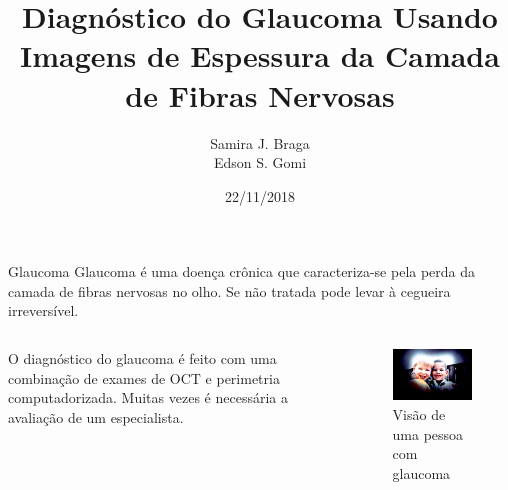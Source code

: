 \documentclass{beamer}
\title{Diagnóstico do Glaucoma Usando Imagens de Espessura da Camada de Fibras Nervosas}
\author{Samira J. Braga \\ Edson S. Gomi}
\institute{Escola Politécnica da Universidade de São Paulo}
\date{22/11/2018}
\begin{document}

\begin{frame}
	\maketitle %
\end{frame}




\begin{frame}{Glaucoma}
    Glaucoma é uma doença crônica que caracteriza-se pela perda da camada de fibras nervosas no olho. Se não tratada pode  levar  à  cegueira  irreversível.
    \vfill
    \begin{columns}
        O  diagnóstico  do  glaucoma  é  feito  com  uma combinação  de  exames de OCT e perimetria  computadorizada. Muitas vezes é necessária a avaliação de um especialista. 
		
            \begin{figure}
                \includegraphics[width=\linewidth]{img/glaucomavision.jpg} 
                \caption{Visão de uma pessoa com glaucoma}
            \end{figure}
            
            
    \end{columns}
    
\end{frame}
\end{document}
